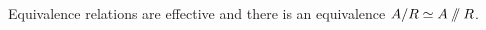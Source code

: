 \documentclass[hott-all.tex]{subfiles}
\begin{document}
% 
\begin{thm}
Equivalence relations are effective and there is an equivalence $A/R \simeq A\sslash  R $.
\end{thm}
% 
% 
% 
% 
\end{document}
